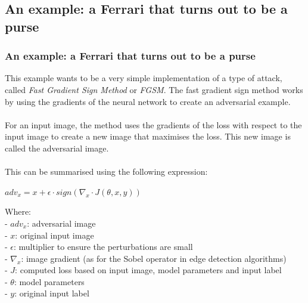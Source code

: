 \documentclass[8pt]{beamer}
\begin{document}
\subsection{An example: a Ferrari that turns out to be a purse}
\begin{frame}
\frametitle{An example: a Ferrari that turns out to be a purse}
This example wants to be a very simple implementation of a type of attack, called \textit{Fast Gradient Sign Method} or \textit{FGSM}. The fast gradient sign method works by using the gradients of the neural network to create an adversarial example.
\\~\\
For an input image, the method uses the gradients of the loss with respect to the input image to create a new image that maximises the loss. This new image is called the adversarial image.
\\~\\
This can be summarised using the following expression:\\
\vspace{0.1cm}
\begin{center}
$
adv_x=x+\epsilon \cdot sign(\nabla_x \cdot J(\theta, x, y))
$
\end{center}
Where:\\
\quad - $adv_x$: adversarial image\\
\quad - $x$: original input image\\
\quad - $\epsilon$: multiplier to ensure the perturbations are small\\
\quad - $\nabla_x$: image gradient (as for the Sobel operator in edge detection algorithms)\\
\quad - $J$: computed loss based on input image, model parameters and input label\\
\quad - $\theta$: model parameters\\
\quad - $y$: original input label\\
\end{frame}
\end{document}
